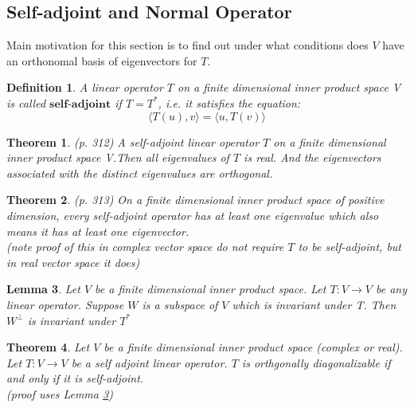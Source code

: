\documentclass{article}
\newcommand{\innerproduct}[1]{\langle#1\rangle}
\newtheorem{theorem}{Theorem}[section]
\newtheorem{definition}{Definition}[section]
\newtheorem{lemma}[theorem]{Lemma}
\numberwithin{theorem}{subsection} %
\numberwithin{definition}{subsection} %
\begin{document}
\subsection{Self-adjoint and Normal Operator}
Main motivation for this section is to find out under what conditions does $V$ have an
orthonomal basis of eigenvectors for $T$.

\begin{definition}
    A linear operator $T$ on a finite dimensional inner product space V is called
    $\textbf{self-adjoint}$ if $T=T^*$, i.e. it satisfies the equation:
    \begin{equation*}
        \innerproduct{T(u),v} = \innerproduct{u,T(v)}
    \end{equation*}
\end{definition}

\begin{theorem}
    (p. 312)
    A self-adjoint linear operator $T$ on a finite dimensional inner product space V.Then
    all eigenvalues of $T$ is real. And the eigenvectors associated with the distinct
    eigenvalues are orthogonal.
\end{theorem}

\begin{theorem}
    (p. 313)
    On a finite dimensional inner product space of positive dimension, every self-adjoint
    operator has at least one eigenvalue which also means it has at least one eigenvector.\\

    (note proof of this in complex vector space do not require $T$ to be self-adjoint, but in
    real vector space it does)
\end{theorem}

\begin{lemma}\label{lem1}
    Let $V$ be a finite dimensional inner product space. Let $T:V
    \rightarrow V$ be any linear operator. Suppose $W$ is a subspace of $V$ which is
    invariant under T. Then $W^\perp$ is invariant under $T^*$
\end{lemma}

\begin{theorem}
    Let $V$ be a finite dimensional inner product space (complex or real). Let $T:V
    \rightarrow V$ be a self adjoint linear operator. $T$ is orthgonally diagonalizable if
    and only if it is self-adjoint. \\
    (proof uses Lemma \ref{lem1})
\end{theorem}
\end{document}
